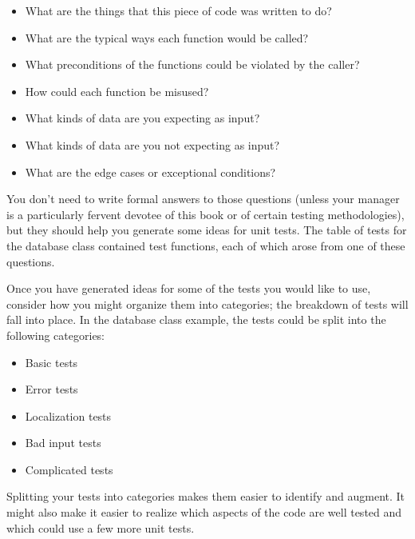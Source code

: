 \begin{itemize}
\item
What are the things that this piece of code was written to do?

\item
What are the typical ways each function would be called?

\item
What preconditions of the functions could be violated by the caller?

\item
How could each function be misused?

\item
What kinds of data are you expecting as input?

\item
What kinds of data are you not expecting as input?

\item
What are the edge cases or exceptional conditions?
\end{itemize}

You don’t need to write formal answers to those questions (unless your manager is a particularly fervent devotee of this book or of certain testing methodologies), but they should help you generate some ideas for unit tests. The table of tests for the database class contained test functions, each of which arose from one of these questions.

Once you have generated ideas for some of the tests you would like to use, consider how you might organize them into categories; the breakdown of tests will fall into place. In the database class example, the tests could be split into the following categories:

\begin{itemize}
\item
Basic tests

\item
Error tests

\item
Localization tests

\item
Bad input tests

\item
Complicated tests
\end{itemize}

Splitting your tests into categories makes them easier to identify and augment. It might also make it easier to realize which aspects of the code are well tested and which could use a few more unit tests.

